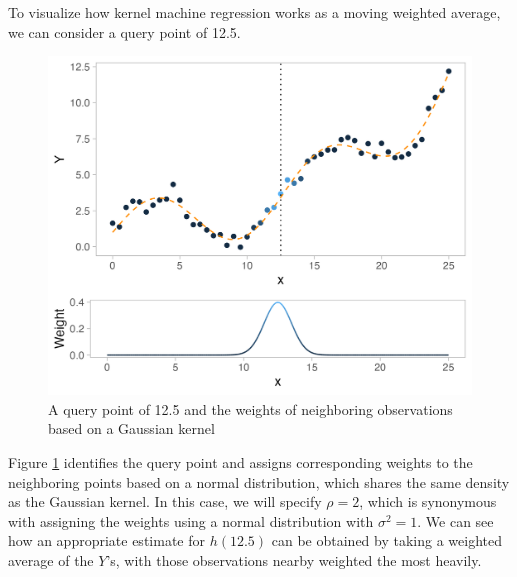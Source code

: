 \documentclass[12pt, twoside]{amherstthesis}
\begin{document}
To visualize how kernel machine regression works as a moving weighted average, we can consider a query point of 12.5.
\begin{figure}

{\centering \includegraphics[width=0.75\linewidth]{figures/ch3_toy2} 

}

\caption{A query point of 12.5 and the weights of neighboring observations based on a Gaussian kernel}\label{fig:toy2}
\end{figure}
Figure \ref{fig:toy2} identifies the query point and assigns corresponding weights to the neighboring points based on a normal distribution, which shares the same density as the Gaussian kernel. In this case, we will specify \(\rho = 2\), which is synonymous with assigning the weights using a normal distribution with \(\sigma^2=1\). We can see how an appropriate estimate for \(h(12.5)\) can be obtained by taking a weighted average of the \(Y\)'s, with those observations nearby weighted the most heavily.
\end{document}

